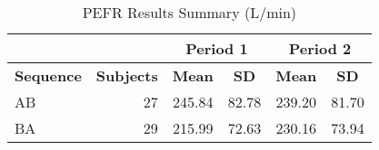 \begin{table}[h]
\centering
\caption{PEFR Results Summary (L/min)}
\centering
\begin{tabular}[t]{l|r|c|c|c|c}
\multicolumn{2}{c|}{} &
\multicolumn{2}{|c|}{Period 1} &
\multicolumn{2}{|c}{Period 2} \\
\hline
\textbf{Sequence} & \textbf{Subjects} & \textbf{Mean} & \textbf{SD} & \textbf{Mean} & \textbf{SD}\\
\hline
AB & 27 & 245.84 & 82.78 & 239.20 & 81.70\\
\hline
BA & 29 & 215.99 & 72.63 & 230.16 & 73.94\\
\hline
\end{tabular}
\label{summaryTable}
\end{table}
